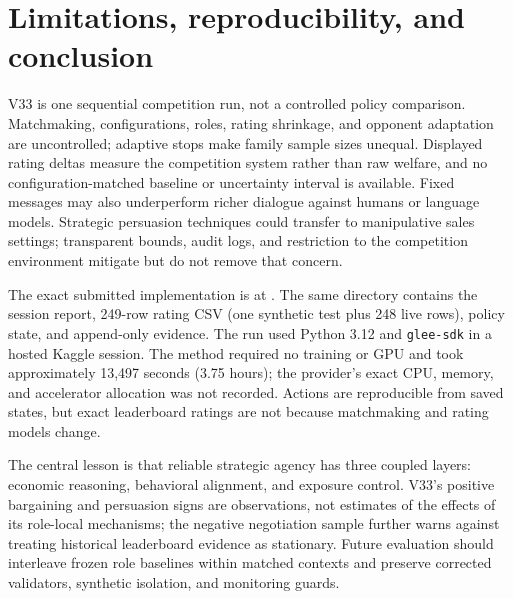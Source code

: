 \section{Limitations, reproducibility, and conclusion}

V33 is one sequential competition run, not a controlled policy comparison.
Matchmaking, configurations, roles, rating shrinkage, and opponent adaptation
are uncontrolled; adaptive stops make family sample sizes unequal. Displayed
rating deltas measure the competition system rather than raw welfare, and no
configuration-matched baseline or uncertainty interval is available. Fixed
messages may also underperform richer dialogue against humans or language
models. Strategic persuasion techniques could transfer to manipulative sales
settings; transparent bounds, audit logs, and restriction to the competition
environment mitigate but do not remove that concern.

The exact submitted implementation is
at \CodeURL. The same directory contains the session report, 249-row rating
CSV (one synthetic test plus 248 live rows), policy state, and append-only
evidence. The run used Python 3.12 and \texttt{glee-sdk} in a hosted Kaggle
session. The method required no training or GPU and took approximately 13,497
seconds (3.75 hours); the provider's exact CPU, memory, and accelerator
allocation was not recorded.
Actions are reproducible from saved states, but exact leaderboard ratings are
not because matchmaking and rating models change.

The central lesson is that reliable strategic agency has three coupled layers:
economic reasoning, behavioral alignment, and exposure control. V33's positive
bargaining and persuasion signs are observations, not estimates of the effects
of its role-local mechanisms; the negative negotiation sample further warns
against treating historical leaderboard evidence as stationary. Future
evaluation should interleave frozen role baselines within matched contexts and
preserve corrected validators, synthetic isolation, and monitoring guards.
